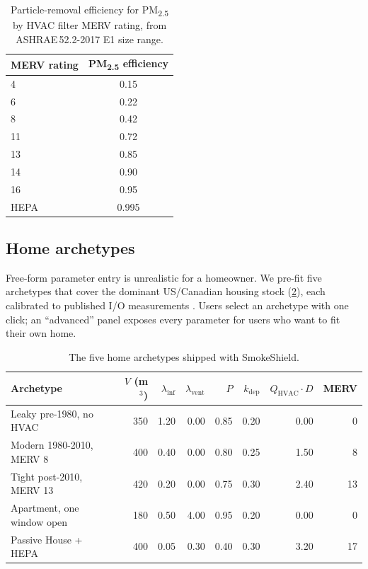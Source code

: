 \documentclass[10pt,twocolumn]{article}
\begin{document}
\begin{table}
\centering
\small
\begin{tabular}{lc}
\toprule
MERV rating & PM\textsubscript{2.5} efficiency \\
\midrule
4 & 0.15 \\
6 & 0.22 \\
8 & 0.42 \\
11 & 0.72 \\
13 & 0.85 \\
14 & 0.90 \\
16 & 0.95 \\
HEPA & 0.995 \\
\bottomrule
\end{tabular}
\caption{Particle-removal efficiency for PM\textsubscript{2.5} by
HVAC filter MERV rating, from ASHRAE\,52.2-2017 E1 size range.}
\label{tab:merv}
\end{table}

\subsection{Home archetypes}

Free-form parameter entry is unrealistic for a homeowner.  We pre-fit
five archetypes that cover the dominant US/Canadian housing stock
(\cref{tab:archetypes}), each calibrated to published I/O measurements
\citep{nehls2024campus,nceh2023residential,liu2001particle}.  Users
select an archetype with one click; an ``advanced'' panel exposes
every parameter for users who want to fit their own home.

\begin{table}
\centering
\small
\begin{tabular}{lrrrrrrr}
\toprule
Archetype & $V$ (m$^3$) & $\lambda_{\text{inf}}$ & $\lambda_{\text{vent}}$ & $P$ & $k_{\text{dep}}$ & $Q_{\text{HVAC}}\cdot D$ & MERV \\
\midrule
Leaky pre-1980, no HVAC      & 350 & 1.20 & 0.00 & 0.85 & 0.20 & 0.00  & 0 \\
Modern 1980-2010, MERV 8     & 400 & 0.40 & 0.00 & 0.80 & 0.25 & 1.50  & 8 \\
Tight post-2010, MERV 13     & 420 & 0.20 & 0.00 & 0.75 & 0.30 & 2.40  & 13 \\
Apartment, one window open   & 180 & 0.50 & 4.00 & 0.95 & 0.20 & 0.00  & 0 \\
Passive House + HEPA         & 400 & 0.05 & 0.30 & 0.40 & 0.30 & 3.20  & 17 \\
\bottomrule
\end{tabular}
\caption{The five home archetypes shipped with SmokeShield.}
\label{tab:archetypes}
\end{table}
\end{document}
